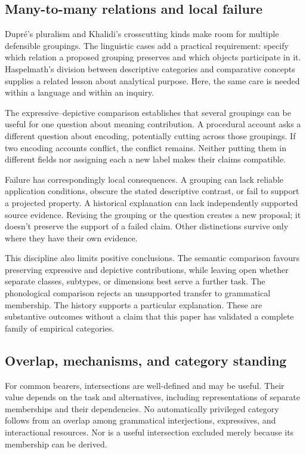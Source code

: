\documentclass[12pt]{article}
\begin{document}
\subsection{Many-to-many relations and local failure}

Dupr\'e's pluralism and Khalidi's crosscutting kinds make room for
multiple defensible groupings. The linguistic cases add a practical
requirement: specify which relation a proposed grouping preserves and
which objects participate in it. Haspelmath's division between descriptive
categories and comparative concepts supplies a related lesson about
analytical purpose. Here, the same care is needed within a language
and within an inquiry.

The expressive--depictive comparison establishes that several groupings
can be useful for one question about meaning contribution. A procedural
account asks a different question about encoding, potentially cutting
across those groupings. If two encoding accounts conflict,
the conflict remains. Neither putting them in different fields nor
assigning each a new label makes their claims compatible.

Failure has correspondingly local consequences. A grouping can lack
reliable application conditions, obscure the stated descriptive contrast,
or fail to support a projected property. A historical explanation can
lack independently supported source evidence. Revising the grouping or
the question creates a new proposal; it doesn't preserve the support
of a failed claim. Other distinctions survive only where they have
their own evidence.

This discipline also limits positive conclusions. The semantic comparison
favours preserving expressive and depictive contributions, while leaving
open whether separate classes, subtypes, or dimensions best serve a
further task. The phonological comparison rejects an unsupported transfer
to grammatical membership. The  history supports a particular
explanation. These are substantive outcomes without a claim that this
paper has validated a complete family of empirical categories.

\subsection{Overlap, mechanisms, and category standing}

For common bearers, intersections are well-defined and may be useful.
Their value depends on the task and alternatives, including representations
of separate memberships and their dependencies. No automatically privileged
category follows from an overlap among grammatical interjections,
expressives, and interactional resources. Nor is a useful intersection
excluded merely because its membership can be derived.
\end{document}
